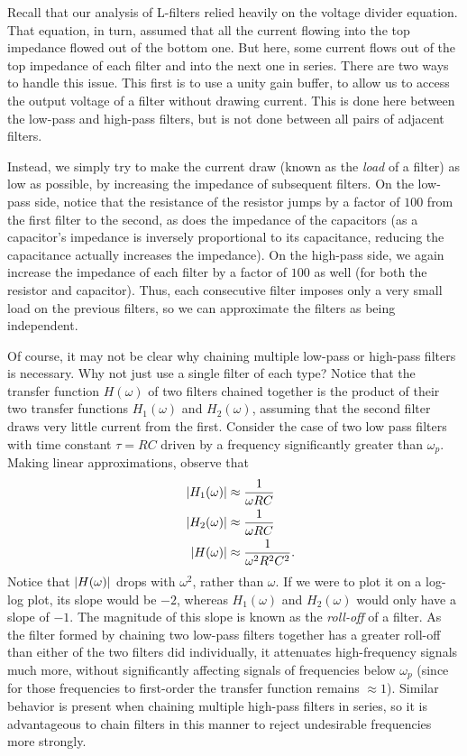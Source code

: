 \documentclass[letterpaper]{article}
\theoremstyle{remark}
\DeclarePairedDelimiter\abs{\lvert}{\rvert}%
\newcommand{\eqn}[1]{\begin{alignat*}{2}#1\end{alignat*}}
\begin{document}
Recall that our analysis of L-filters relied heavily on the voltage divider equation. That equation, in turn, assumed that all the current flowing into the top impedance flowed out of the bottom one. But here, some current flows out of the top impedance of each filter and into the next one in series. There are two ways to handle this issue. This first is to use a unity gain buffer, to allow us to access the output voltage of a filter without drawing current. This is done here between the low-pass and high-pass filters, but is not done between all pairs of adjacent filters. 

Instead, we simply try to make the current draw (known as the \emph{load} of a filter) as low as possible, by increasing the impedance of subsequent filters. On the low-pass side, notice that the resistance of the resistor jumps by a factor of $100$ from the first filter to the second, as does the impedance of the capacitors (as a capacitor's impedance is inversely proportional to its capacitance, reducing the capacitance actually increases the impedance). On the high-pass side, we again increase the impedance of each filter by a factor of $100$ as well (for both the resistor and capacitor). Thus, each consecutive filter imposes only a very small load on the previous filters, so we can approximate the filters as being independent.

Of course, it may not be clear why chaining multiple low-pass or high-pass filters is necessary. Why not just use a single filter of each type? Notice that the transfer function $H(\omega)$ of two filters chained together is the product of their two transfer functions $H_1(\omega)$ and $H_2(\omega)$, assuming that the second filter draws very little current from the first. Consider the case of two low pass filters with time constant $\tau = RC$ driven by a frequency significantly greater than $\omega_p$. Making linear approximations, observe that
\eqn{
    && \abs{H_1(\omega)} &\approx \frac{1}{\omega RC} \\
    && \abs{H_2(\omega)} &\approx \frac{1}{\omega RC} \\
    && \abs{H(\omega)} &\approx \frac{1}{\omega^2 R^2C^2}.
}
Notice that $\abs{H(\omega)}$ drops with $\omega^2$, rather than $\omega$. If we were to plot it on a log-log plot, its slope would be $-2$, whereas $H_1(\omega)$ and $H_2(\omega)$ would only have a slope of $-1$. The magnitude of this slope is known as the \emph{roll-off} of a filter. As the filter formed by chaining two low-pass filters together has a greater roll-off than either of the two filters did individually, it attenuates high-frequency signals much more, without significantly affecting signals of frequencies below $\omega_p$ (since for those frequencies to first-order the transfer function remains $\approx 1$). Similar behavior is present when chaining multiple high-pass filters in series, so it is advantageous to chain filters in this manner to reject undesirable frequencies more strongly.
\end{document}
